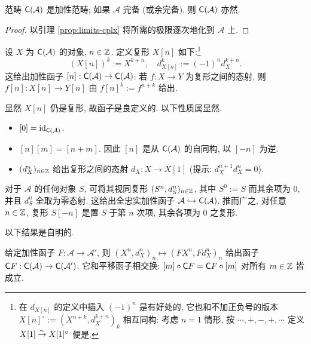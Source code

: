 \begin{proposition}\label{prop:additive-cat-cplx}
	范畴 $\mathsf{C}(\mathcal{A})$ 是加性范畴; 如果 $\mathcal{A}$ 完备 (或余完备), 则 $\mathsf{C}(\mathcal{A})$ 亦然.
\end{proposition}
\begin{proof}
	以引理 \ref{prop:limits-cplx} 将所需的极限逐次地化到 $\mathcal{A}$ 上.
\end{proof}

\begin{definition}[平移函子]\label{def:translation-functor}
	设 $X$ 为 $\mathsf{C}(\mathcal{A})$ 的对象, $n \in \mathbb{Z}$. 定义复形 $X[n]$ 如下:\footnote{在 $d_{X[n]}$ 的定义中插入 $(-1)^n$ 是有好处的, 它也和不加正负号的版本 $X[n]^\circ := \left(X^{n+k}, d_X^{k+n}\right)_k$ 相互同构: 考虑 $n=1$ 情形, 按 $\cdots, +, -, +, \cdots$ 定义 $X[1] \stackrel{\sim}{\rightarrow} X[1]^\circ$ 便是.}
	\[ \left( X[n]\right)^k := X^{k+n}, \quad d_{X[n]}^k := (-1)^n d_X^{k+n}. \]
	这给出加性函子 $[n]: \mathsf{C}(\mathcal{A}) \to \mathsf{C}(\mathcal{A})$: 若 $f: X \to Y$ 为复形之间的态射, 则 $f[n]: X[n] \to Y[n]$ 由 $f[n]^k := f^{n+k}$ 给出.
\end{definition}

显然 $X[n]$ 仍是复形, 故函子是良定义的. 以下性质属显然.
\begin{itemize}
	\item $[0] = \mathrm{id}_{\mathsf{C}(\mathcal{A})}$.
	\item $[n][m] = [n+m]$. 因此 $[n]$ 是从 $\mathsf{C}(\mathcal{A})$ 的自同构, 以 $[-n]$ 为逆.
	\item $(d_X^n)_{n \in \mathbb{Z}}$ 给出复形之间的态射 $d_X: X \to X[1]$ (提示: $d_X^{n+1} d_X^n = 0$).
\end{itemize}

\begin{convention}\label{con:concentrated-cplx}
	对于 $\mathcal{A}$ 的任何对象 $S$, 可将其视同复形 $(S^n, d^n_S)_{n \in \mathbb{Z}}$, 其中 $S^0 := S$ 而其余项为 $0$, 并且 $d_S^n$ 全取为零态射. 这给出全忠实加性函子 $\mathcal{A} \hookrightarrow \mathsf{C}(\mathcal{A})$. 推而广之, 对任意 $n \in \mathbb{Z}$, 复形 $S[-n]$ 是置 $S$ 于第 $n$ 次项, 其余各项为 $0$ 之复形.
\end{convention}

以下结果是自明的.

\begin{proposition}\label{prop:CA-functoriality}
	给定加性函子 $F: \mathcal{A} \to \mathcal{A}'$, 则 $(X^n, d_X^n)_n \mapsto (FX^n, Fd_X^n)_n$ 给出函子 $\mathsf{C}F: \mathsf{C}(\mathcal{A}) \to \mathsf{C}(\mathcal{A}')$. 它和平移函子相交换: $[m] \circ \mathsf{C}F = \mathsf{C}F \circ [m]$ 对所有 $m \in \mathbb{Z}$ 皆成立.
\end{proposition}

